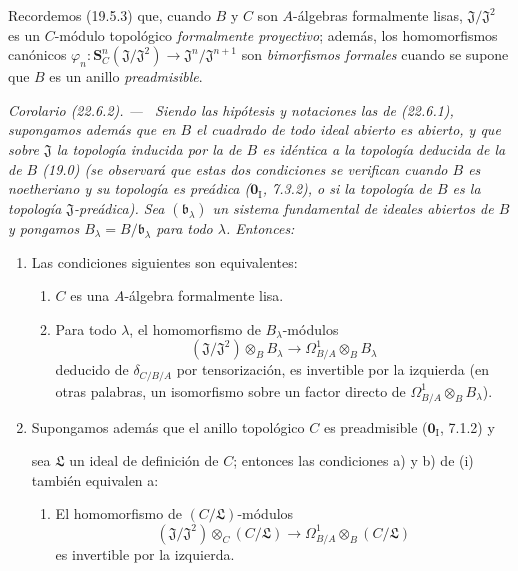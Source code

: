 \documentclass[10pt,oneside]{book}
\makeatletter
\newcommand{\setmanualcurrentlabel}[1]{\def\@currentlabel{#1}}
\newcommand{\oldpage}[2][]{%
  \setcounter{footnote}{0}%
  \marginpar{\scriptsize\textbf{#1}~|~#2}\ignorespaces}
\newenvironment{corollary}[1][]{%
  \setmanualcurrentlabel{#1}\par\medskip\noindent\itshape Corolario (#1). ---\ }{\par}
\makeatother
\begin{document}
Recordemos (19.5.3) que, cuando $B$ y $C$ son $A$-álgebras formalmente
lisas, $\mathfrak J/\mathfrak J^2$ es un $C$-módulo topológico
\emph{formalmente proyectivo}; además, los homomorfismos canónicos
$\varphi_n:\mathbf S_C^n(\mathfrak J/\mathfrak J^2)
\longrightarrow\mathfrak J^n/\mathfrak J^{n+1}$ son
\emph{bimorfismos formales} cuando se supone que $B$ es un anillo
\emph{preadmisible}.
\begin{corollary}[22.6.2]
\label{0.22.6.2-es}
Siendo las hipótesis y notaciones las de \textup{(22.6.1)}, supongamos además que
en $B$ el cuadrado de todo ideal abierto es abierto, y que sobre $\mathfrak J$ la
topología inducida por la de $B$ es idéntica a la topología deducida de
la de $B$ \textup{(19.0)} \textup{(se observará que estas dos condiciones se verifican cuando
$B$ es \emph{noetheriano} y su topología es \emph{preádica} ($\mathbf{0}_{\mathrm I}$, 7.3.2), o si la
topología de $B$ es la topología $\mathfrak J$-\emph{preádica})}. Sea
$(\mathfrak b_\lambda)$ un sistema fundamental de ideales abiertos de $B$ y
pongamos $B_\lambda=B/\mathfrak b_\lambda$ para todo $\lambda$. Entonces:
\begin{enumerate}
  \item[\rm(i)] Las condiciones siguientes son equivalentes:
  \begin{enumerate}
    \item[\textup{a)}] $C$ es una $A$-álgebra formalmente lisa.
    \item[\textup{b)}] Para todo $\lambda$, el homomorfismo de $B_\lambda$-módulos
    \begin{equation}
    \label{0.22.6.2.1-es}
      (\mathfrak J/\mathfrak J^2)\otimes_BB_\lambda
      \longrightarrow\Omega^1_{B/A}\otimes_BB_\lambda
      \tag{22.6.2.1}
    \end{equation}
    deducido de $\delta_{C/B/A}$ por tensorización, es invertible por la izquierda
    \textup{(en otras palabras, un isomorfismo sobre un factor directo de
    $\Omega^1_{B/A}\otimes_BB_\lambda$)}.
  \end{enumerate}
  \item[\rm(ii)] Supongamos además que el anillo topológico $C$ es
  preadmisible \textup{($\mathbf 0_{\mathrm I}$, 7.1.2)} y

  \oldpage[0\textsubscript{IV-1}]{206}

  sea $\mathfrak L$ un ideal de definición de $C$; entonces las condiciones \textup{a)}
  y \textup{b)} de \textup{(i)} también equivalen a:
  \begin{enumerate}
    \item[\textup{c)}] El homomorfismo de $(C/\mathfrak L)$-módulos
    \[
      (\mathfrak J/\mathfrak J^2)\otimes_C(C/\mathfrak L)
      \longrightarrow\Omega^1_{B/A}\otimes_B(C/\mathfrak L)
    \]
    es invertible por la izquierda.
  \end{enumerate}
\end{enumerate}
\end{corollary}
\end{document}
